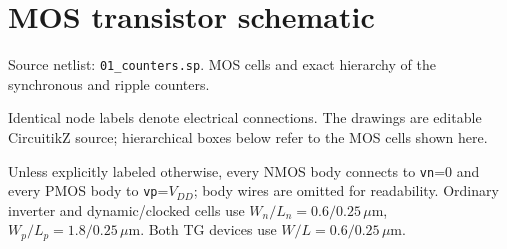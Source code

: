 \clearpage\section{MOS transistor schematic}
\begingroup\small
Source netlist: \texttt{01\_counters.sp}. MOS cells and exact hierarchy of the synchronous and ripple counters.

Identical node labels denote electrical connections. The drawings are editable CircuitikZ source; hierarchical boxes below refer to the MOS cells shown here.

Unless explicitly labeled otherwise, every NMOS body connects to \texttt{vn}=0 and every PMOS body to \texttt{vp}=\(V_{DD}\); body wires are omitted for readability. Ordinary inverter and dynamic/clocked cells use \(W_n/L_n=0.6/0.25\,\mu\mathrm m\), \(W_p/L_p=1.8/0.25\,\mu\mathrm m\). Both TG devices use \(W/L=0.6/0.25\,\mu\mathrm m\). 

